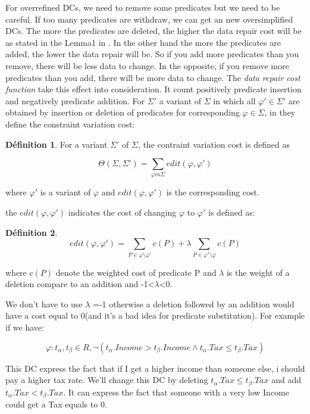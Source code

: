 \documentclass[letterpaper, 12pt]{report}
\theoremstyle{definition}
\newtheorem{mydef}{Définition}
\begin{document}
For overrefined DCs, we need to remove some predicates but we need to be careful. If too many predicates are withdraw, we can get an new oversimplified DCs. The more the predicates are deleted, the higher the data repair cost will be as stated in the Lemma1 in \cite{main}. In the other hand the more the predicates are added, the lower the data repair will be. So if you add more predicates than you remove, there will be less data to change. In the opposite, if you remove more predicates than you add, there will be more data to change. The \emph{data repair cost function} take this effect into consideration. It count positively predicate insertion and negatively predicate addition. For $\Sigma '$ a variant of $\Sigma$ in which all $\varphi ' \in \Sigma '$ are obtained by insertion or deletion of predicates for corresponding $\varphi \in \Sigma$, in \cite{main} they define the constraint variation cost:

\begin{mydef}
For a variant $\Sigma '$ of $\Sigma$, the contraint variation cost is defined as

$$\Theta (\Sigma,\Sigma ') = \sum_{\varphi in \Sigma} edit(\varphi,\varphi ')$$

\hspace*{2cm} where $\varphi '$ is a variant of $\varphi$ and $edit(\varphi,\varphi ')$ is the corresponding cost.
\end{mydef}

the $edit(\varphi , \varphi ')$ indicates the cost of changing $\varphi$ to $\varphi'$ is defined as:
\begin{mydef}
$$
 edit(\varphi, \varphi') = \sum_{P \in \varphi \setminus \varphi'} c(P) + \lambda \sum_{P \in \varphi' \setminus \varphi} c(P)$$
 
where $c(P)$ denote the weighted cost of predicate P and $\lambda$ is the weight of a deletion compare to an addition and -1<$\lambda$<0.
\end{mydef}

We don't have to use $\lambda$ =-1 otherwise a deletion followed by an addition would have a cost equal to 0(and it's a bad idea for predicate substitution). For example if we have:

$$ \varphi : t_\alpha,t_\beta \in R, \neg(t_\alpha.Income > t_\beta.Income \wedge t_\alpha.Tax \leq t_\beta.Tax)$$

This DC express the fact that if I get a higher income than someone else, i should pay a higher tax rate. We'll change this DC by deleting $t_\alpha.Tax \leq t_\beta.Tax$ and add $t_\alpha.Tax < t_\beta.Tax$. It can express the fact that someone with a very low Income could get a Tax equals to 0.
\end{document}
